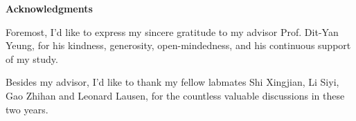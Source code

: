 \centerline{{\bf \Large Acknowledgments}} \vspace{5mm} \noindent

Foremost, I'd like to express my sincere gratitude to my advisor Prof. Dit-Yan Yeung, for his kindness, generosity, open-mindedness, and his continuous support of my study.

Besides my advisor, I'd like to thank my fellow labmates Shi Xingjian, Li Siyi, Gao Zhihan and Leonard Lausen, for the countless valuable discussions in these two years.

